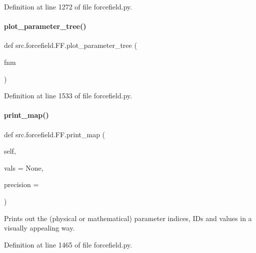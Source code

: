 Definition at line 1272 of file forcefield.\+py.

\mbox{\label{classsrc_1_1forcefield_1_1FF_a362121bdb7852ba8bb1b9a6a1ba3a32f}} 
\paragraph{\texorpdfstring{plot\+\_\+parameter\+\_\+tree()}{plot\_parameter\_tree()}}
{\footnotesize\ttfamily def src.\+forcefield.\+F\+F.\+plot\+\_\+parameter\+\_\+tree (\begin{DoxyParamCaption}\item[{}]{fnm }\end{DoxyParamCaption})}



Definition at line 1533 of file forcefield.\+py.

\mbox{\label{classsrc_1_1forcefield_1_1FF_a89b99d1b614774279870e1912f1edd3d}} 
\paragraph{\texorpdfstring{print\+\_\+map()}{print\_map()}}
{\footnotesize\ttfamily def src.\+forcefield.\+F\+F.\+print\+\_\+map (\begin{DoxyParamCaption}\item[{}]{self,  }\item[{}]{vals = {\ttfamily None},  }\item[{}]{precision = {} }\end{DoxyParamCaption})}



Prints out the (physical or mathematical) parameter indices, I\+Ds and values in a visually appealing way. 



Definition at line 1465 of file forcefield.\+py.

